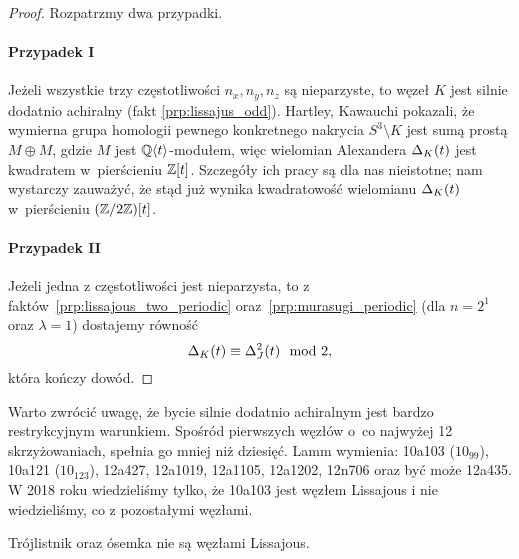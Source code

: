 \begin{proof}
    Rozpatrzmy dwa przypadki.

    \paragraph{Przypadek I}
    Jeżeli wszystkie trzy częstotliwości $n_x, n_y, n_z$ są nieparzyste, to węzeł $K$ jest silnie dodatnio achiralny (fakt \ref{prp:lissajus_odd}).
    Hartley, Kawauchi \cite{hartley1979} pokazali, że wymierna grupa homologii pewnego konkretnego nakrycia $S^3 \setminus K$ jest sumą prostą $M \oplus M$, gdzie $M$ jest $\mathbb Q\langle t \rangle$-modułem, więc wielomian Alexandera $\Delta_K(t)$ jest kwadratem w~pierścieniu $\mathbb Z[t]$.
    Szczegóły ich pracy są dla nas nieistotne; nam wystarczy zauważyć, że stąd już wynika kwadratowość wielomianu $\Delta_K(t)$ w~pierścieniu $(\mathbb Z/2\mathbb Z)[t]$.

    \paragraph{Przypadek II}
    Jeżeli jedna z częstotliwości jest nieparzysta, to z faktów~\ref{prp:lissajous_two_periodic} oraz~\ref{prp:murasugi_periodic} (dla $n=2^1$ oraz $\lambda = 1$) dostajemy równość
    \begin{equation}
\label{eqn:lissajous_squared}%
        \alexander_K(t) \equiv \alexander^2_{J}(t) \mod 2,
    \end{equation}
    która kończy dowód.
\end{proof}

Warto zwrócić uwagę, że bycie silnie dodatnio achiralnym jest bardzo restrykcyjnym warunkiem.
Spośród pierwszych węzłów o~co najwyżej 12 skrzyżowaniach, spełnia go mniej niż dziesięć.
Lamm \cite{lamm2021} wymienia: 10a103 ($10_{99}$), 10a121 ($10_{123}$), 12a427, 12a1019, 12a1105, 12a1202, 12n706 oraz być może 12a435.
%
%
%
%
%
%
%
%
%
%
W 2018 roku wiedzieliśmy tylko, że 10a103 jest węzłem Lissajous i nie wiedzieliśmy, co z pozostałymi węzłami.

\begin{example}
    Trójlistnik oraz ósemka nie są węzłami Lissajous.
\end{example}


